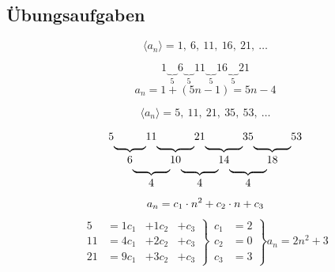 \subsection{Übungsaufgaben}

\begin{uebung}
	\begin{question}
		\[
			\langle a_n \rangle = 1,\ 6,\ 11,\ 16,\ 21,\ \ldots
		\]
	\end{question}

	\begin{solution}
		\[
			1\underbrace{\quad}_{5}6\underbrace{\quad}_{5}11\underbrace{\quad}_{5}16\underbrace{\quad}_{5}21
		\]
		\[
			a_n = 1+(5n - 1) = 5n - 4
		\]
	\end{solution}

	\begin{question}
		\[
			\langle a_n \rangle = 5,\ 11,\ 21,\ 35,\ 53,\ \ldots
		\]
	\end{question}

	\begin{solution}
		\[
			\begin{tabular}{ccccccccccccc}
				5 &      & 11   &      & 21   &      & 35   &      & 53 \\[-3pt]
				  & \ubf &      & \ubf &      & \ubf &      & \ubf      \\
				  & 6    &      & 10   &      & 14   &      & 18        \\[-3pt]
				  &      & \ubf &      & \ubf &      & \ubf             \\
				  &      & 4    &      & 4    &      & 4
			\end{tabular}
		\]
		\[
			a_n = c_1 \cdot n^2 + c_2 \cdot n + c_3 \\
		\]
		\begin{align*}
			\left.
			\begin{array}{ccccc}
				5  & = 1 c_1 & + 1 c_2 & + c_3 \\
				11 & = 4 c_1 & + 2 c_2 & + c_3 \\
				21 & = 9 c_1 & + 3 c_2 & + c_3
			\end{array}
			\right \}
			\left.
			\begin{array}{cc}
				c_1 & = 2 \\
				c_2 & = 0 \\
				c_3 & = 3
			\end{array}
			\right \}
			a_n = 2n^2 + 3
		\end{align*}
	\end{solution}


\end{uebung}
